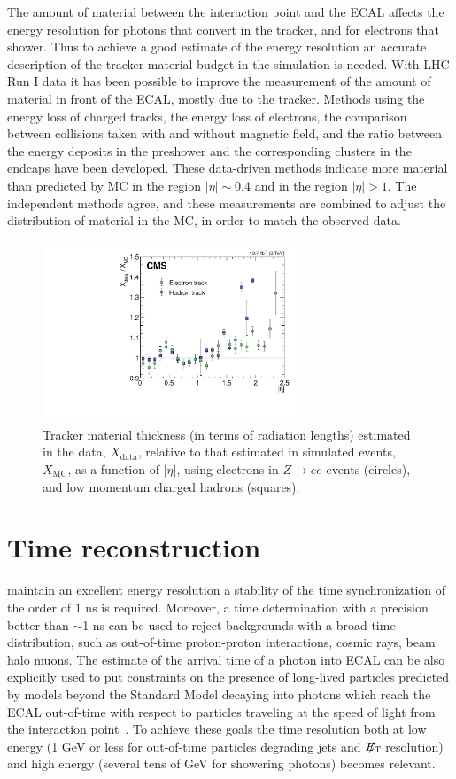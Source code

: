 \documentclass[journal]{IEEEtran}
\newcommand{\ETslash}{\ensuremath{E_{\mathrm{T}}\hspace{-1.1em}/\kern0.45em}}
\begin{document}
The amount of material between the interaction point and the ECAL affects the energy resolution for photons that convert in the tracker, and for electrons that shower. Thus to achieve a good estimate of the energy resolution an accurate description of the tracker material budget in the simulation is needed. 
With LHC Run I data it has been possible to improve the measurement of the amount of material in front of the ECAL, mostly due to the tracker. Methods using the energy loss of charged tracks, the energy loss of electrons, the comparison between collisions taken with and without magnetic field, and the ratio between the energy deposits in the preshower and the corresponding clusters in the endcaps have been developed. These data-driven methods indicate more material than predicted by MC in the region $\vert\eta\vert \sim 0.4$ and in the region $\vert\eta\vert>1$. The independent methods agree, and these measurements are combined to adjust the distribution of material in the MC, in order to match the observed data.
%
\begin{figure}[!t]
  \begin{center}
    \includegraphics[width=3.0in]{material}
    \caption{Tracker material thickness (in terms of radiation lengths) estimated in the data, $X_\mathrm{data}$, relative to that estimated in simulated events, $X_\mathrm{MC}$, as a function of $\vert\eta\vert$, using electrons in $Z\to ee$ events (circles), and low momentum charged hadrons (squares). \label{fig:material}}
  \end{center}
\end{figure}
%


\section{Time reconstruction}
\label{sec:timereco}
 maintain an excellent energy resolution a stability of the time synchronization of the order of 1 ns is required. Moreover, a time determination with a precision better than $\sim$1 ns can be used to reject backgrounds with a broad time distribution, such as out-of-time proton-proton interactions, cosmic rays, beam halo muons. The estimate of the arrival time of a photon into ECAL can be also explicitly used to put constraints on the presence of long-lived particles predicted by models beyond the Standard Model decaying into photons which reach the ECAL out-of-time with respect to particles traveling at the speed of light from the interaction point~\cite{Chatrchyan:2012ir}. To achieve these goals the time resolution both at low energy (1 GeV or less for out-of-time particles degrading jets and $\ETslash$ resolution) and high energy (several tens of GeV for showering photons) becomes relevant.
\end{document}
